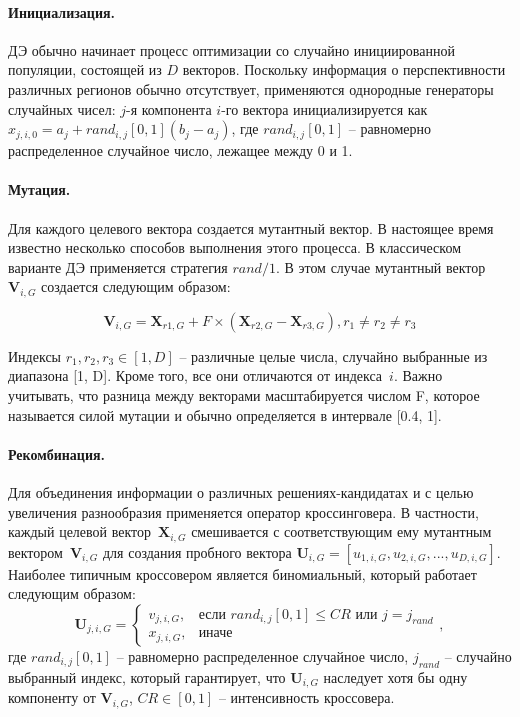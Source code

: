 \documentclass{llncs}
\begin{document}
\paragraph*{Инициализация.}

ДЭ обычно начинает процесс оптимизации со случайно инициированной популяции, состоящей из $D$ векторов. Поскольку информация о перспективности различных регионов обычно отсутствует, применяются однородные генераторы случайных чисел: $j$-я компонента $i$-го вектора инициализируется как $x_{j, i, 0} = a_{j} + rand_{i,j}[0, 1](b_j - a_j )$, где $rand_{i,j} [0, 1]$ -- равномерно распределенное случайное число, лежащее между 0 и 1.

\paragraph*{Мутация.}

Для каждого целевого вектора создается мутантный вектор. В настоящее время известно несколько способов выполнения этого процесса. В классическом варианте ДЭ применяется стратегия $rand/1$. В этом случае мутантный вектор $\textbf{V}_{i,G}$ создается следующим образом:

\begin{equation}\label{eq:de_mut}
  \textbf{V}_{i,G} = \textbf{X}_{r1,G} + F \times (\textbf{X}_{r2,G} - \textbf{X}_{r3,G}), r_1 \neq r_2 \neq r_3
\end{equation}

Индексы $r_1, r_2, r_3 \in [1, D]$ -- различные целые числа, случайно выбранные из диапазона [1, D]. Кроме того, все они отличаются от индекса~$i$. Важно учитывать, что разница между векторами масштабируется числом F, которое называется силой мутации и обычно определяется в интервале [0.4, 1].

\paragraph*{Рекомбинация.}

Для объединения информации о различных решениях-кандидатах и с целью увеличения разнообразия применяется оператор кроссинговера. В частности, каждый целевой вектор~$\textbf{X}_{i,G}$ смешивается с соответствующим ему мутантным вектором~$\textbf{V}_{i,G}$ для создания пробного вектора $\textbf{U}_{i,G} = [u_{1,i,G}, u_{2,i,G}, ..., u_{D,i,G}]$. Наиболее типичным кроссовером является биномиальный, который работает следующим образом:
\begin{equation}\label{eq:de_crossover}
  \textbf{U}_{j,i,G} =
    \begin{cases}
     v_{j,i,G}, & \mbox{если~} rand_{i,j}[0, 1] \leq CR \mbox{~или~} j = j_{rand} \\
     x_{j,i,G}, & \mbox{иначе}
    \end{cases},
\end{equation}
где $rand_{i,j}[0, 1]$ -- равномерно распределенное случайное число, $j_{rand}$ -- случайно выбранный индекс, который гарантирует, что $\textbf{U}_{i,G}$ наследует хотя бы одну компоненту от $\textbf{V}_{i,G}$, $CR \in [0, 1]$ -- интенсивность кроссовера.
\end{document}
